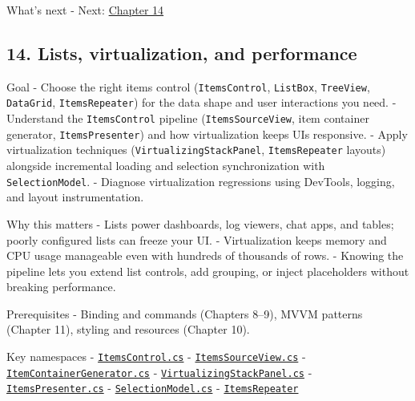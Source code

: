What's next - Next: \href{Chapter14.md}{Chapter 14}

\newpage

\subsection{14. Lists, virtualization, and
performance}\label{lists-virtualization-and-performance}

Goal - Choose the right items control
(\passthrough{\lstinline!ItemsControl!},
\passthrough{\lstinline!ListBox!}, \passthrough{\lstinline!TreeView!},
\passthrough{\lstinline!DataGrid!},
\passthrough{\lstinline!ItemsRepeater!}) for the data shape and user
interactions you need. - Understand the
\passthrough{\lstinline!ItemsControl!} pipeline
(\passthrough{\lstinline!ItemsSourceView!}, item container generator,
\passthrough{\lstinline!ItemsPresenter!}) and how virtualization keeps
UIs responsive. - Apply virtualization techniques
(\passthrough{\lstinline!VirtualizingStackPanel!},
\passthrough{\lstinline!ItemsRepeater!} layouts) alongside incremental
loading and selection synchronization with
\passthrough{\lstinline!SelectionModel!}. - Diagnose virtualization
regressions using DevTools, logging, and layout instrumentation.

Why this matters - Lists power dashboards, log viewers, chat apps, and
tables; poorly configured lists can freeze your UI. - Virtualization
keeps memory and CPU usage manageable even with hundreds of thousands of
rows. - Knowing the pipeline lets you extend list controls, add
grouping, or inject placeholders without breaking performance.

Prerequisites - Binding and commands (Chapters 8--9), MVVM patterns
(Chapter 11), styling and resources (Chapter 10).

Key namespaces -
\href{https://github.com/AvaloniaUI/Avalonia/blob/master/src/Avalonia.Controls/ItemsControl.cs}{\passthrough{\lstinline!ItemsControl.cs!}}
-
\href{https://github.com/AvaloniaUI/Avalonia/blob/master/src/Avalonia.Controls/ItemsSourceView.cs}{\passthrough{\lstinline!ItemsSourceView.cs!}}
-
\href{https://github.com/AvaloniaUI/Avalonia/blob/master/src/Avalonia.Controls/Generators/ItemContainerGenerator.cs}{\passthrough{\lstinline!ItemContainerGenerator.cs!}}
-
\href{https://github.com/AvaloniaUI/Avalonia/blob/master/src/Avalonia.Controls/VirtualizingStackPanel.cs}{\passthrough{\lstinline!VirtualizingStackPanel.cs!}}
-
\href{https://github.com/AvaloniaUI/Avalonia/blob/master/src/Avalonia.Controls/Primitives/ItemsPresenter.cs}{\passthrough{\lstinline!ItemsPresenter.cs!}}
-
\href{https://github.com/AvaloniaUI/Avalonia/blob/master/src/Avalonia.Controls/Selection/SelectionModel.cs}{\passthrough{\lstinline!SelectionModel.cs!}}
-
\href{https://github.com/AvaloniaUI/Avalonia/tree/master/src/Avalonia.Controls/ItemsRepeater}{\passthrough{\lstinline!ItemsRepeater!}}


